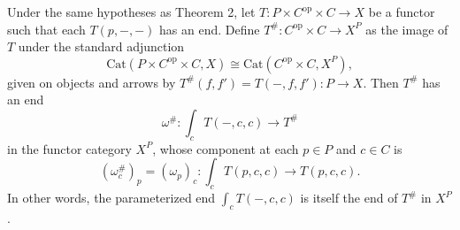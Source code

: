 Under the same hypotheses as Theorem 2, let $T: P \times C^{\mathrm{op}} \times C \rightarrow X$ be a functor such that each $T(p, -, -)$ has an end. Define $T^{\#}: C^{\mathrm{op}} \times C \rightarrow X^P$ as the image of $T$ under the standard adjunction
\[
\mathrm{Cat}(P \times C^{\mathrm{op}} \times C, X) \cong \mathrm{Cat}(C^{\mathrm{op}} \times C, X^P),
\]
given on objects and arrows by $T^{\#}(f, f') = T(-, f, f'): P \rightarrow X$. Then $T^{\#}$ has an end
\[
\omega^{\#}: \int_c T(-, c, c) \rightarrow T^{\#}
\]
in the functor category $X^P$, whose component at each $p \in P$ and $c \in C$ is
\[
(\omega^{\#}_c)_p = (\omega_p)_c: \int_c T(p, c, c) \rightarrow T(p, c, c).
\]
In other words, the parameterized end $\int_c T(-, c, c)$ is itself the end of $T^{\#}$ in $X^P$.
